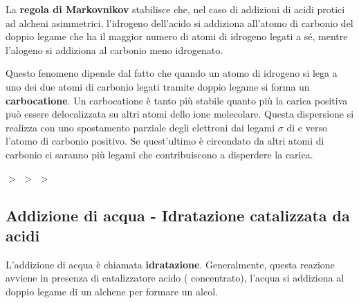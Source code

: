 La \textbf{regola di Markovnikov} stabilisce che, nel caso di addizioni di acidi protici  ad alcheni asimmetrici, l'idrogeno dell'acido si addiziona all'atomo di carbonio del doppio legame che ha il maggior numero di atomi di idrogeno legati a sé, mentre l'alogeno si addiziona al carbonio meno idrogenato.

Questo fenomeno dipende dal fatto che quando un atomo di idrogeno si lega a uno dei due atomi di carbonio legati tramite doppio legame si forma un \textbf{carbocatione}. Un carbocatione è tanto più stabile quanto più la carica positiva può essere delocalizzata su altri atomi dello ione molecolare. Questa dispersione si realizza con uno spostamento parziale degli elettroni dai legami \(\sigma\) di  e  verso l'atomo di carbonio positivo. Se quest'ultimo è circondato da altri atomi di carbonio ci saranno più legami che contribuiscono a disperdere la carica.
\chemnameinit{}
\begin{reaction*}
	\quad $>$ \quad
	\quad $>$ \quad
	\quad $>$ \quad
\end{reaction*}


\subsection{Addizione di acqua - Idratazione catalizzata da acidi}\label{ssec:idratazione}
L'addizione di acqua è chiamata \textbf{idratazione}. Generalmente, questa reazione avviene in presenza di catalizzatore acido ( concentrato), l'acqua si addiziona al doppio legame di un alchene per formare un alcol.


